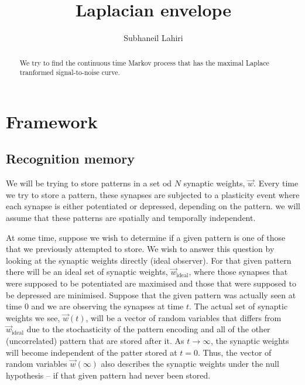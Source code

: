 \documentclass[12pt]{article}
\title{Laplacian envelope}
\author{Subhaneil Lahiri
%
}
\newcommand{\syn}{\vec{w}}
\newcommand{\synid}{\syn_\text{ideal}}
\begin{document}
\maketitle




\begin{abstract}
  We try to find the continuous time Markov process that has the maximal Laplace tranformed signal-to-noise curve.
\end{abstract}

\tableofcontents


\section{Framework}\label{sec:framework}

\subsection{Recognition memory}\label{sec:recog}


We will be trying to store patterns in a set od $N$ synaptic weights, $\syn$.
Every time we try to store a pattern, these synapses are subjected to a plasticity event where each synapse is either potentiated or depressed, depending on the pattern.
we will assume that these patterns are spatially and temporally independent.

At some time, suppose we wish to determine if a given pattern is one of those that we previously attempted to store.
We wish to answer this question by looking at the synaptic weights directly (ideal observer).
For that given pattern there will be an ideal set of synaptic weights, $\synid$, where those synapses that were supposed to be potentiated are maximised and those that were supposed to be depressed are minimised.
Suppose that the given pattern was actually seen at time 0 and we are observing the synapses at time $t$.
The actual set of synaptic weights we see, $\syn(t)$, will be a vector of random variables that differs from $\synid$ due to the stochasticity of the pattern encoding and all of the other (uncorrelated) pattern that are stored after it.
As $t\to\infty$, the synaptic weights will become independent of the patter stored at $t=0$.
Thus, the vector of random variables $\syn(\infty)$ also describes the synaptic weights under the null hypothesis -- if that given pattern had never been stored.
\end{document}
